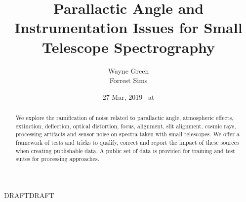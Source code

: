 \documentclass[letter,11pt,oneside]{article}
\def\documentisdraft{DRAFT}
\def\drafttest{DRAFT}
\def\wgdocdate{27 Mar, 2019}
\def\wgdocdatetime{\wgdocdate~ at \currenttime}
\begin{document}


\title{Parallactic Angle and Instrumentation Issues for Small Telescope Spectrography}
\author{Wayne Green \\
Forrest Sims}
\date{\wgdocdatetime}
\maketitle

\begin{abstract}
We explore the ramification of noise related to parallactic angle,
atmospheric effects, extinction, deflection, optical distortion,
focus, alignment, slit alignment, cosmic rays, processing artifacts
and sensor noise on spectra taken with small telescopes. We offer a
framework of tests and tricks  to qualify, correct and report the
impact of these sources when creating publishable data. A public set
of data is provided for training and test suites for processing
approaches.

\end{abstract}

 


\setcounter{section}{0}

\ifx\documentisdraft\drafttest
\linenumbers    %
\fi
\end{document}
